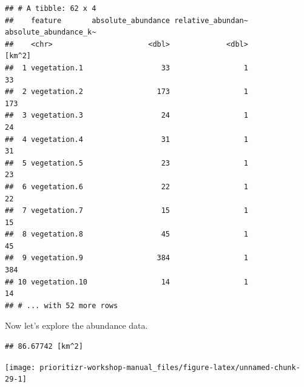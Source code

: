 \documentclass[12pt,]{book}
\newenvironment{Shaded}{\begin{snugshade}}{\end{snugshade}}
\newcommand{\KeywordTok}[1]{\textcolor[rgb]{0.13,0.29,0.53}{\textbf{#1}}}
\newcommand{\DataTypeTok}[1]{\textcolor[rgb]{0.13,0.29,0.53}{#1}}
\newcommand{\StringTok}[1]{\textcolor[rgb]{0.31,0.60,0.02}{#1}}
\newcommand{\CommentTok}[1]{\textcolor[rgb]{0.56,0.35,0.01}{\textit{#1}}}
\newcommand{\OperatorTok}[1]{\textcolor[rgb]{0.81,0.36,0.00}{\textbf{#1}}}
\newcommand{\NormalTok}[1]{#1}
\begin{document}
\begin{verbatim}
## # A tibble: 62 x 4
##    feature       absolute_abundance relative_abundan~ absolute_abundance_k~
##    <chr>                      <dbl>             <dbl>                [km^2]
##  1 vegetation.1                  33                 1                    33
##  2 vegetation.2                 173                 1                   173
##  3 vegetation.3                  24                 1                    24
##  4 vegetation.4                  31                 1                    31
##  5 vegetation.5                  23                 1                    23
##  6 vegetation.6                  22                 1                    22
##  7 vegetation.7                  15                 1                    15
##  8 vegetation.8                  45                 1                    45
##  9 vegetation.9                 384                 1                   384
## 10 vegetation.10                 14                 1                    14
## # ... with 52 more rows
\end{verbatim}

Now let's explore the abundance data.

\begin{Shaded}
\end{Shaded}

\begin{verbatim}
## 86.67742 [km^2]
\end{verbatim}

\begin{Shaded}
\end{Shaded}

\begin{center}\texttt{[image: prioritizr-workshop-manual\_files/figure-latex/unnamed-chunk-29-1]} \end{center}

\begin{Shaded}
\end{Shaded}
\end{document}

